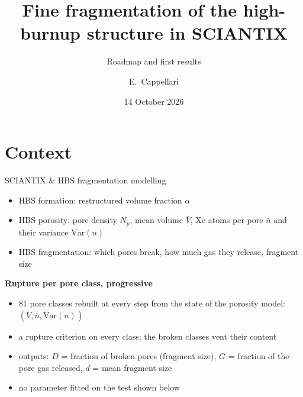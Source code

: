 \documentclass[10pt,aspectratio=169]{beamer}
\title{Fine fragmentation of the high-burnup structure in SCIANTIX}
\subtitle{Roadmap and first results}
\author{E.\ Cappellari}
\institute{POLIMI -- CEA}
\date{14 October 2026}
\newcommand{\oo}[1]{{\color{own}#1}}     %
\begin{document}
\maketitle

\section{Context}

\begin{frame}{SCIANTIX \& HBS fragmentation modelling}
\begin{itemize}
\item HBS formation: restructured volume fraction $\alpha$
\item HBS porosity: pore density $N_p$, mean volume $\bar V$, Xe atoms per pore $\bar n$ and their variance $\mathrm{Var}(n)$
\item \oo{HBS fragmentation}: which pores break, how much gas they release, fragment size
\end{itemize}

\textbf{Rupture per pore class, progressive}
\begin{itemize}
\item 81 pore classes rebuilt at every step from the state of the porosity model: $(\bar V,\bar n,\mathrm{Var}(n))$
\item a rupture criterion on every class; the broken classes vent their content
\item outputs: $D$ = fraction of broken pores (fragment size), $G$ = fraction of the pore gas released,
      $d$ = mean fragment size
\item no parameter fitted on the test shown below
\end{itemize}
\end{frame}
\end{document}
